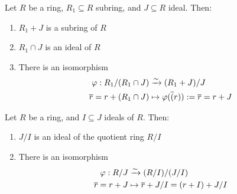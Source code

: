\begin{definition}
 Let $R$ be a ring, $R_1 \subseteq R$ subring, and $J \subseteq R$ ideal. Then:
\begin{enumerate}[label=(\roman*)]
\item $R_1 + J$ is a subring of $R$
\item $R_1 \cap J$ is an ideal of $R$
\item There is an isomorphism 
\begin{align}
\varphi: R_1/(R_1 \cap J) &\xrightarrow{\sim} (R_1 + J)/J \nonumber \\
\overline{r} = r + (R_1 \cap J) &\mapsto \varphi(\overline(r)) := \overline{r} = r+J \nonumber
\end{align}
\end{enumerate}
\end{definition}


\begin{definition}
 Let $R$ be a ring, and $I \subseteq J$ ideals of $R$. Then: 
\begin{enumerate}[label=(\roman*)]
\item $J/I$ is an ideal of the quotient ring $R/I$
\item There is an isomorphism
\begin{align}
\varphi: R/J &\xrightarrow{\sim} (R/I)/(J/I) \nonumber \\
\overline{r}=r+J &\mapsto \overline{r} + J/I = (r+I) + J/I \nonumber
\end{align}
\end{enumerate}
\end{definition}


